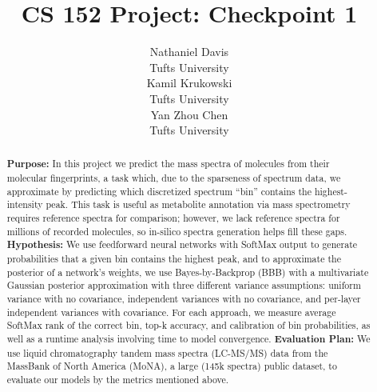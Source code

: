 \documentclass{article}
\title{CS 152 Project: Checkpoint 1}
\author{Nathaniel Davis \\
    Tufts University \\ \And 
    Kamil Krukowski \\
    Tufts University \\
    \And Yan Zhou Chen \\
    Tufts University}
\begin{document}
\maketitle

\begin{abstract}
  \textbf{Purpose:} In this project we predict the mass spectra of molecules from their molecular fingerprints, a task which, due to the sparseness of spectrum data, we approximate by predicting which discretized spectrum “bin” contains the highest-intensity peak. This task is useful as metabolite annotation via mass spectrometry requires reference spectra for comparison; however, we lack reference spectra for millions of recorded molecules, so in-silico spectra generation helps fill these gaps. \textbf{Hypothesis:} We use feedforward neural networks with SoftMax output to generate probabilities that a given bin contains the highest peak, and to approximate the posterior of a network’s weights, we use Bayes-by-Backprop (BBB) with a multivariate Gaussian posterior approximation with three different variance assumptions: uniform variance with no covariance, independent variances with no covariance, and per-layer independent variances with covariance. For each approach, we measure average SoftMax rank of the correct bin, top-k accuracy, and calibration of bin probabilities, as well as a runtime analysis involving time to model convergence. \textbf{Evaluation Plan:} We use liquid chromatography tandem mass spectra (LC-MS/MS) data from the MassBank of North America (MoNA), a large (145k spectra) public dataset, to evaluate our models by the metrics mentioned above.
\end{abstract}
\end{document}
